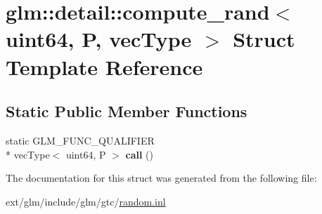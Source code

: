 \hypertarget{structglm_1_1detail_1_1compute__rand_3_01uint64_00_01_p_00_01vec_type_01_4}{\section{glm\-:\-:detail\-:\-:compute\-\_\-rand$<$ uint64, P, vec\-Type $>$ Struct Template Reference}
\label{structglm_1_1detail_1_1compute__rand_3_01uint64_00_01_p_00_01vec_type_01_4}
}
\subsection*{Static Public Member Functions}
\begin{DoxyCompactItemize}
\item 
\hypertarget{structglm_1_1detail_1_1compute__rand_3_01uint64_00_01_p_00_01vec_type_01_4_aaee716157dba6c26ee7bb5d176f5d68f}{static G\-L\-M\-\_\-\-F\-U\-N\-C\-\_\-\-Q\-U\-A\-L\-I\-F\-I\-E\-R \\*
vec\-Type$<$ uint64, P $>$ {\bfseries call} ()}\label{structglm_1_1detail_1_1compute__rand_3_01uint64_00_01_p_00_01vec_type_01_4_aaee716157dba6c26ee7bb5d176f5d68f}

\end{DoxyCompactItemize}


The documentation for this struct was generated from the following file\-:\begin{DoxyCompactItemize}
\item 
ext/glm/include/glm/gtc/\hyperlink{random_8inl}{random.\-inl}\end{DoxyCompactItemize}
